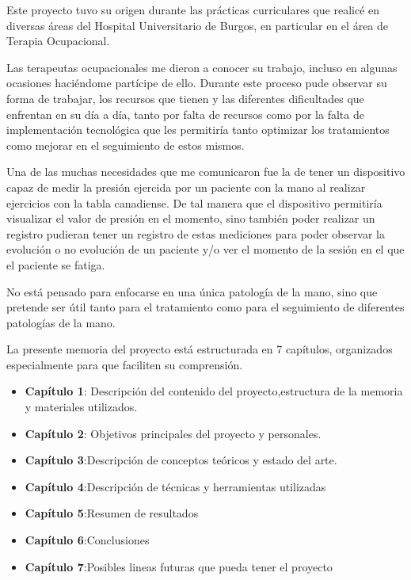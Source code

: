 Este proyecto tuvo su origen durante las prácticas curriculares que realicé en diversas áreas del Hospital Universitario de Burgos, en particular en el área de Terapia Ocupacional. 

Las terapeutas ocupacionales me dieron a conocer su trabajo, incluso en algunas ocasiones haciéndome partícipe de ello. Durante este proceso pude observar su forma de trabajar, los recursos que tienen y las diferentes dificultades que enfrentan en su día a día, tanto por falta de recursos como por la falta de implementación tecnológica que les permitiría tanto optimizar los tratamientos como mejorar en el seguimiento de estos mismos.

Una de las muchas necesidades que me comunicaron fue la de tener un dispositivo capaz de medir la presión ejercida por un paciente con la mano al realizar ejercicios con la tabla canadiense. De tal manera que el dispositivo permitiría visualizar el valor de presión en el momento, sino también poder realizar un registro pudieran tener un registro de estas mediciones para poder observar la evolución o no evolución de un paciente y/o ver el momento de la sesión en el que el paciente se fatiga.

No está pensado para enfocarse en una única patología de la mano, sino que pretende ser útil tanto para el tratamiento como para el seguimiento de diferentes patologías de la mano.

La presente memoria del proyecto está estructurada en 7 capítulos, organizados especialmente para que faciliten su comprensión.
\begin{itemize}
    \item \textbf{Capítulo 1}: Descripción del contenido del proyecto,estructura de la memoria y materiales utilizados.
    \item \textbf{Capítulo 2}: Objetivos principales del proyecto y personales.
    \item \textbf{Capítulo 3}:Descripción de conceptos teóricos y estado del arte.
    \item \textbf{Capítulo 4}:Descripción de técnicas y herramientas utilizadas
    \item \textbf{Capítulo 5}:Resumen de resultados 
    \item \textbf{Capítulo 6}:Conclusiones 
    \item \textbf{Capítulo 7}:Posibles lineas futuras que pueda tener el proyecto
\end{itemize}